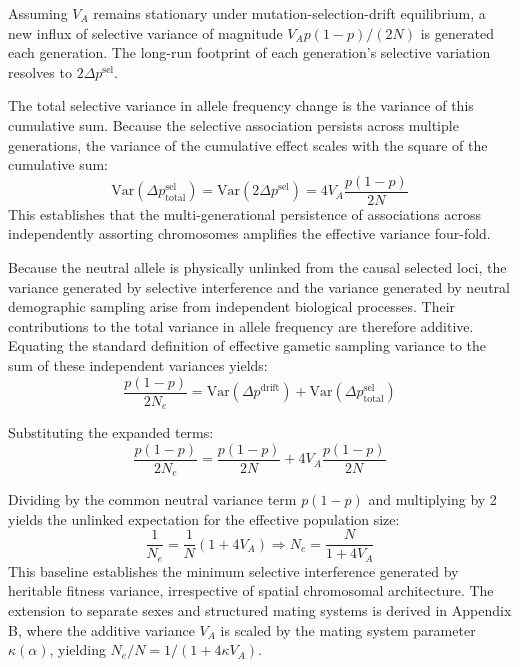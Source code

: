 \documentclass[12pt]{article}
\begin{document}
Assuming $V_A$ remains stationary under mutation-selection-drift equilibrium, a new influx of selective variance of magnitude $V_A p(1-p)/(2N)$ is generated each generation. The long-run footprint of each generation's selective variation resolves to $2\Delta p^{\text{sel}}$.

The total selective variance in allele frequency change is the variance of this cumulative sum. Because the selective association persists across multiple generations, the variance of the cumulative effect scales with the square of the cumulative sum:
\begin{equation}
    \text{Var}(\Delta p_{\text{total}}^{\text{sel}}) = \text{Var}(2 \Delta p^{\text{sel}}) = 4 V_A \frac{p(1-p)}{2N}
\end{equation}
This establishes that the multi-generational persistence of associations across independently assorting chromosomes amplifies the effective variance four-fold.

Because the neutral allele is physically unlinked from the causal selected loci, the variance generated by selective interference and the variance generated by neutral demographic sampling arise from independent biological processes. Their contributions to the total variance in allele frequency are therefore additive. Equating the standard definition of effective gametic sampling variance to the sum of these independent variances yields:
\begin{equation}
    \frac{p(1-p)}{2N_e} = \text{Var}(\Delta p^{\text{drift}}) + \text{Var}(\Delta p_{\text{total}}^{\text{sel}})
\end{equation}

Substituting the expanded terms:
\begin{equation}
    \frac{p(1-p)}{2N_e} = \frac{p(1-p)}{2N} + 4 V_A \frac{p(1-p)}{2N}
\end{equation}

Dividing by the common neutral variance term $p(1-p)$ and multiplying by 2 yields the unlinked expectation for the effective population size:
\begin{equation}
    \frac{1}{N_e} = \frac{1}{N} (1 + 4V_A) \Rightarrow N_e = \frac{N}{1 + 4V_A}
\end{equation}
This baseline establishes the minimum selective interference generated by heritable fitness variance, irrespective of spatial chromosomal architecture. The extension to separate sexes and structured mating systems is derived in Appendix B, where the additive variance $V_A$ is scaled by the mating system parameter $\kappa(\alpha)$, yielding $N_e/N = 1/(1+4\kappa V_A)$.
\end{document}
